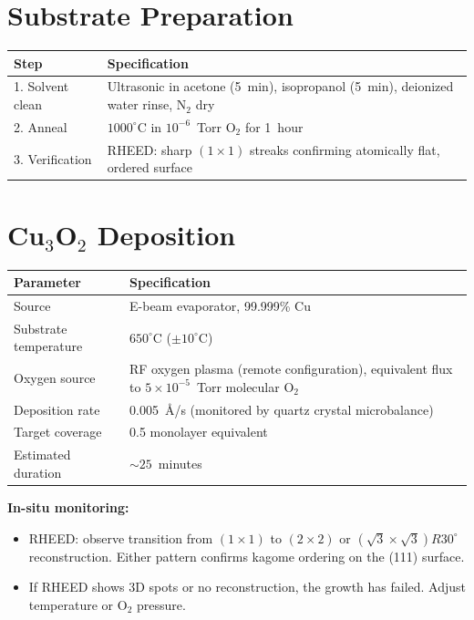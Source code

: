 \documentclass[11pt, a4paper]{article}
\begin{document}
\section{Substrate Preparation}

\begin{center}
\begin{tabular}{@{}lp{9cm}@{}}
\toprule
\textbf{Step} & \textbf{Specification} \\
\midrule
1. Solvent clean & Ultrasonic in acetone (5~min), isopropanol
  (5~min), deionized water rinse, N$_2$ dry \\
2. Anneal & $1000^\circ$C in $10^{-6}$~Torr O$_2$ for 1~hour \\
3. Verification & RHEED: sharp $(1 \times 1)$ streaks confirming
  atomically flat, ordered surface \\
\bottomrule
\end{tabular}
\end{center}

\section{Cu$_3$O$_2$ Deposition}

\begin{center}
\begin{tabular}{@{}lp{9cm}@{}}
\toprule
\textbf{Parameter} & \textbf{Specification} \\
\midrule
Source & E-beam evaporator, 99.999\% Cu \\
Substrate temperature & $650^\circ$C ($\pm 10^\circ$C) \\
Oxygen source & RF oxygen plasma (remote configuration),
  equivalent flux to $5 \times 10^{-5}$~Torr molecular O$_2$ \\
Deposition rate & 0.005~\AA/s (monitored by quartz crystal
  microbalance) \\
Target coverage & 0.5 monolayer equivalent \\
Estimated duration & $\sim 25$~minutes \\
\bottomrule
\end{tabular}
\end{center}

\textbf{In-situ monitoring:}
\begin{itemize}[nosep]
  \item RHEED: observe transition from $(1 \times 1)$ to
        $(2 \times 2)$ or
        $(\sqrt{3} \times \sqrt{3})R30^\circ$ reconstruction.
        Either pattern confirms kagome ordering on the (111)
        surface.
  \item If RHEED shows 3D spots or no reconstruction, the growth
        has failed. Adjust temperature or O$_2$ pressure.
\end{itemize}
\end{document}
